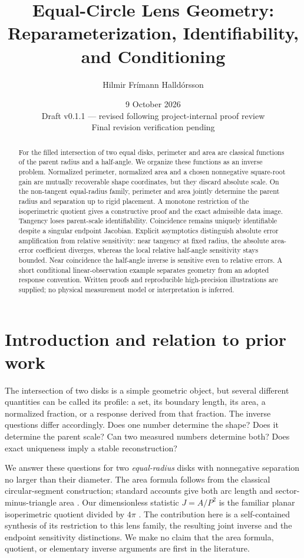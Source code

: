 \documentclass[11pt,a4paper]{article}
\title{Equal-Circle Lens Geometry:\\
Reparameterization, Identifiability,\\and Conditioning}
\author{Hilmir Fr\'imann Halld\'orsson}
\date{9 October 2026\\[3pt]\small Draft v0.1.1 --- revised following project-internal proof review\\
\small Final revision verification pending}
\theoremstyle{definition}
\begin{document}
\maketitle
\begin{abstract}
For the filled intersection of two equal disks, perimeter and area are classical functions of the parent radius and a half-angle. We organize these functions as an inverse problem. Normalized perimeter, normalized area and a chosen nonnegative square-root gain are mutually recoverable shape coordinates, but they discard absolute scale. On the non-tangent equal-radius family, perimeter and area jointly determine the parent radius and separation up to rigid placement. A monotone restriction of the isoperimetric quotient gives a constructive proof and the exact admissible data image. Tangency loses parent-scale identifiability. Coincidence remains uniquely identifiable despite a singular endpoint Jacobian. Explicit asymptotics distinguish absolute error amplification from relative sensitivity: near tangency at fixed radius, the absolute area-error coefficient diverges, whereas the local relative half-angle sensitivity stays bounded. Near coincidence the half-angle inverse is sensitive even to relative errors. A short conditional linear-observation example separates geometry from an adopted response convention. Written proofs and reproducible high-precision illustrations are supplied; no physical measurement model or interpretation is inferred.
\end{abstract}

\section{Introduction and relation to prior work}
The intersection of two disks is a simple geometric object, but several different quantities can be called its profile: a set, its boundary length, its area, a normalized fraction, or a response derived from that fraction. The inverse questions differ accordingly. Does one number determine the shape? Does it determine the parent scale? Can two measured numbers determine both? Does exact uniqueness imply a stable reconstruction?

We answer these questions for two \emph{equal-radius} disks with nonnegative separation no larger than their diameter. The area formula follows from the classical circular-segment construction; standard accounts give both arc length and sector-minus-triangle area \citep{segment,intersection}. Our dimensionless statistic \(J=A/P^2\) is the familiar planar isoperimetric quotient divided by \(4\pi\) \citep{isoperimetric}. The contribution here is a self-contained synthesis of its restriction to this lens family, the resulting joint inverse and the endpoint sensitivity distinctions. We make no claim that the area formula, quotient, or elementary inverse arguments are first in the literature.
\end{document}
